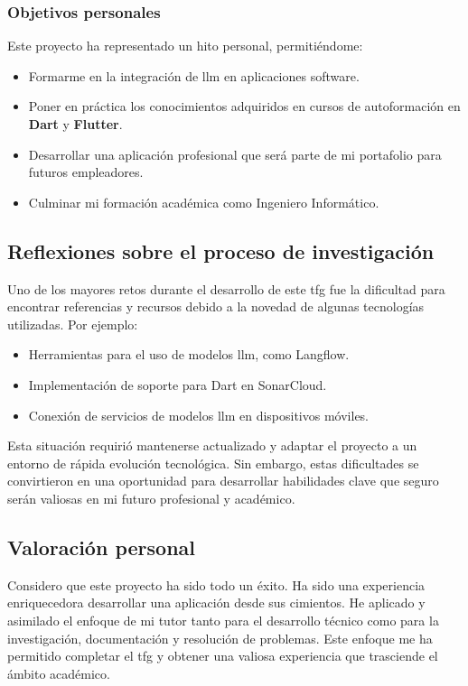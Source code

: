\subsubsection{Objetivos personales}
Este proyecto ha representado un hito personal, permitiéndome:
\begin{itemize}
	\item Formarme en la integración de \acrshort{llm} en aplicaciones software.
	\item Poner en práctica los conocimientos adquiridos en cursos de autoformación en \textbf{Dart} y \textbf{Flutter}.
	\item Desarrollar una aplicación profesional que será parte de mi portafolio para futuros empleadores.
	\item Culminar mi formación académica como Ingeniero Informático.
\end{itemize}

\subsection{Reflexiones sobre el proceso de investigación}
Uno de los mayores retos durante el desarrollo de este \acrshort{tfg} fue la dificultad para encontrar referencias y recursos debido a la novedad de algunas tecnologías utilizadas. Por ejemplo:
\begin{itemize}
	\item Herramientas para el uso de modelos \acrshort{llm}, como Langflow.
	\item Implementación de soporte para Dart en SonarCloud.
	\item Conexión de servicios de modelos \acrshort{llm} en dispositivos móviles.
\end{itemize}

Esta situación requirió mantenerse actualizado y adaptar el proyecto a un entorno de rápida evolución tecnológica. Sin embargo, estas dificultades se convirtieron en una oportunidad para desarrollar habilidades clave que seguro serán valiosas en mi futuro profesional y académico. 

\subsection{Valoración personal}
Considero que este proyecto ha sido todo un éxito. Ha sido una experiencia enriquecedora desarrollar una aplicación desde sus cimientos. He aplicado y asimilado el enfoque de mi tutor tanto para el desarrollo técnico como para la investigación, documentación y resolución de problemas. Este enfoque me ha permitido completar el \acrshort{tfg} y obtener una valiosa experiencia que trasciende el ámbito académico.

